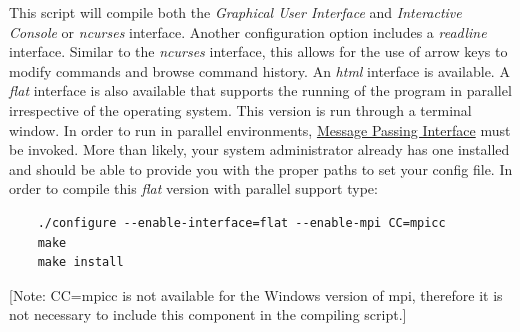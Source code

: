 This script will compile both the \emph{Graphical User Interface} and \emph{Interactive Console} or \emph{ncurses} interface.  Another configuration option includes a \emph{readline} interface.  Similar to the \emph{ncurses} interface, this allows for the use of arrow keys to modify commands and browse command history.  An \emph{html} interface is  available. A \emph{flat} interface is also available that supports the running of the program in parallel irrespective of the operating system. This version is run through a terminal window. In order to run \poy in parallel environments, \href{http://www-unix.mcs.anl.gov/mpi/}{Message Passing Interface} must be invoked. More than likely, your system administrator already has one installed and should be able to provide you with the proper paths to set your config file. In order to compile this \emph{flat} version with parallel support type: 
	\begin{verbatim}
	./configure --enable-interface=flat --enable-mpi CC=mpicc
	make
	make install
	\end{verbatim}
[Note: CC=mpicc is not available for the Windows version of mpi, therefore it is not necessary to include this component in the compiling script.] %


